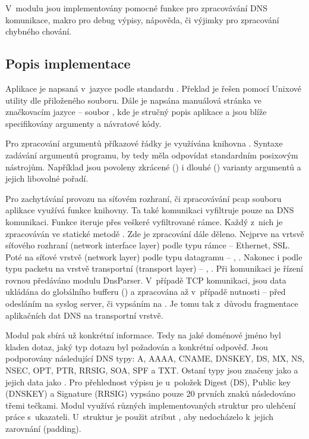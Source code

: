 \documentclass[11pt, a4paper, titlepage]{article}
\begin{document}
V~modulu  jsou implementovány pomocné funkce pro zpracovávání DNS komunikace, makro pro debug výpisy, nápověda, či výjimky pro zpracování chybného chování.
\bigskip



\subsection{Popis implementace}

Aplikace je napsaná v~jazyce  podle standardu . Překlad je řešen pomocí Unixové utility  dle přiloženého  souboru. Dále je napsána manuálová stránka ve značkovacím jazyce  -- soubor , kde je stručný popis aplikace a jsou blíže specifikovány argumenty a návratové kódy.
\bigskip

Pro zpracování argumentů příkazové řádky je využívána knihovna . Syntaxe zadávání argumentů programu, by tedy měla odpovídat standardním posixovým nástrojům. Například jsou povoleny zkrácené () i dlouhé () varianty argumentů a jejich libovolné pořadí.
\bigskip

Pro zachytávání provozu na síťovém rozhraní, či zpracovávání pcap souboru aplikace využívá funkce  knihovny. Ta také komunikaci vyfiltruje pouze na DNS komunikaci. Funkce  iteruje přes veškeré vyfiltrované rámce. Každý z~nich je zpracováván ve statické metodě . Zde je zpracování dále děleno. Nejprve na vrtsvě síťového rozhraní (network interface layer) podle typu rámce -- Ethernet, SSL. Poté na síťové vrstvě (network layer) podle typu datagramu -- , . Nakonec i podle typu packetu na vrstvě transportní (transport layer) -- , . Při  komunikaci je řízení rovnou předáváno modulu DnsParser. V~případě TCP komunikaci, jsou data ukládána do globálního bufferu () a zpracována až v~případě nutnosti -- před odesláním na syslog server, či vypsáním na . Je tomu tak z~důvodu fragmentace aplikačních dat DNS na transportní vrstvě.
\bigskip

Modul  pak sbírá už konkrétní informace. Tedy na jaké doménové jméno byl kladen dotaz, jaký typ dotazu byl požadován a konkrétní odpověď. Jsou podporovány následující DNS typy: A, AAAA, CNAME, DNSKEY, DS, MX, NS, NSEC, OPT, PTR, RRSIG, SOA, SPF a TXT. Ostaní typy jsou značeny jako  a jejich data jako . Pro přehlednost výpisu je u~položek Digest (DS), Public key (DNSKEY) a Signature (RRSIG) vypsáno pouze 20 prvních znaků následováno třemi tečkami. Modul využívá různých implementovaných struktur pro ulehčení práce s~ukazateli. U~struktur je použit atribut , aby nedocházelo k~jejich zarovnání (padding).
\bigskip
\end{document}
